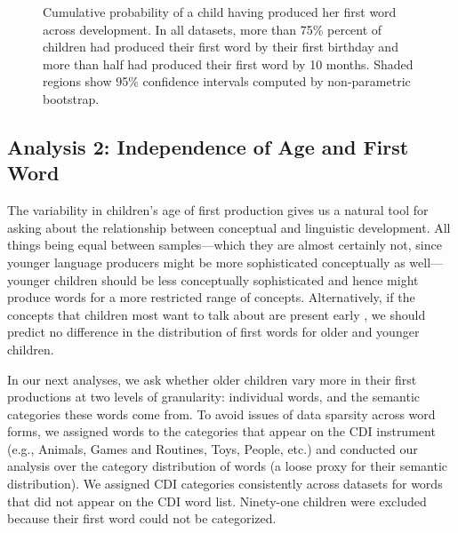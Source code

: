 \documentclass[10pt,letterpaper]{article}
\begin{document}
\begin{figure}[tb]
\caption{\label{fig:cdfs} Cumulative probability of a child having produced her first word across development. In all datasets, more than 75\% percent of children had produced their first word by their first birthday and more than half had produced their first word by 10 months. Shaded regions show 95\% confidence intervals computed by non-parametric bootstrap.}
\end{figure}


\subsection{Analysis 2: Independence of Age and First Word}

The variability in children's age of first production gives us a natural tool for asking about the relationship between conceptual and linguistic development. All things being equal between samples---which they are almost certainly not, since younger language producers might be more sophisticated conceptually as well---younger children should be less conceptually sophisticated and hence might produce words for a more restricted range of concepts. Alternatively, if the concepts that children most want to talk about are present early \cite{snedeker2007,snedeker2012,gleitman1990}, we should predict no difference in the distribution of first words for older and younger children. 

In our next analyses, we ask whether older children vary more in their first productions at two levels of granularity: individual words, and the semantic categories these words come from.  To avoid issues of data sparsity across word forms, we assigned words to the categories that appear on the CDI instrument (e.g., Animals, Games and Routines, Toys, People, etc.) and conducted our analysis over the category distribution of words (a loose proxy for their semantic distribution). We assigned CDI categories consistently across datasets for words that did not appear on the CDI word list. Ninety-one children were excluded because their first word could not be categorized. 
\end{document}
